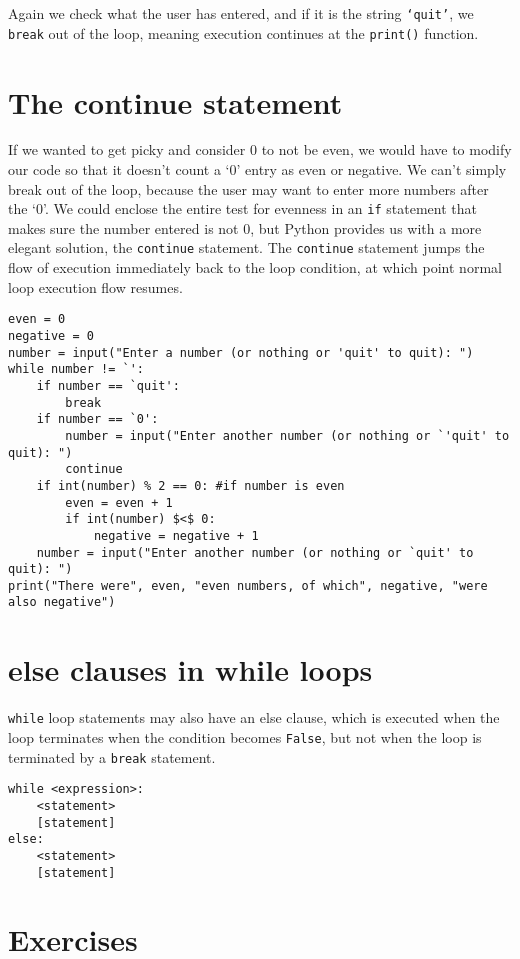 Again we check what the user has entered, and if it is the string   \texttt{`quit'}, we \texttt{break} out of the loop, meaning execution   continues at the \texttt{print()} function.

\section{The continue statement}

If we wanted to get picky and consider 0 to not be even, we would   have to modify our code so that it doesn't count a `0' entry as even or   negative. We can't simply break out of the loop, because the user may   want to enter more numbers after the `0'. We could enclose the entire   test for evenness in an \texttt{if} statement that makes sure the number entered   is not 0, but Python provides us with a more elegant solution, the \texttt{continue} statement.   The \texttt{continue} statement jumps the flow of execution immediately back to   the loop condition, at which point normal loop execution flow   resumes.
\begin{lstlisting}
even = 0
negative = 0
number = input("Enter a number (or nothing or 'quit' to quit): ")
while number != `':
    if number == `quit':
        break
    if number == `0':
        number = input("Enter another number (or nothing or `'quit' to quit): ")
        continue
    if int(number) % 2 == 0: #if number is even
        even = even + 1
        if int(number) $<$ 0:
            negative = negative + 1
    number = input("Enter another number (or nothing or `quit' to quit): ")
print("There were", even, "even numbers, of which", negative, "were also negative")
\end{lstlisting}

\section{else clauses in while loops}

\texttt{while} loop statements may also have an else clause, which is   executed when the loop terminates when the condition becomes \texttt{False}, but   not when the loop is terminated by a \texttt{break} statement.    
\begin{lstlisting}
while <expression>:
    <statement>
    [statement]
else:
    <statement>
    [statement]
\end{lstlisting}

\section{Exercises}

